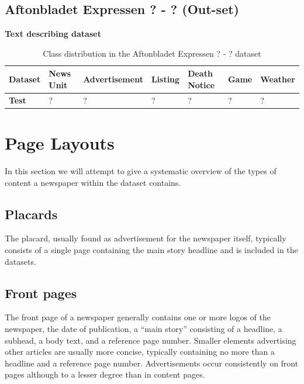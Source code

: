 \documentclass[english, bibtex]{kththesis}
\begin{document}
\subsection{Aftonbladet Expressen ? - ? (Out-set)}

\textbf{Text describing dataset}

\begin{table}[!ht]
  \begin{center}
    \caption{Class distribution in the  Aftonbladet Expressen ? - ? dataset}
    \label{tab:outsetclassdist}
    \begin{tabular}{l|l|l|l|l|l|l} %
    \textbf{Dataset} & \textbf{News Unit} & \textbf{Advertisement} & \textbf{Listing} & \textbf{Death Notice} & \textbf{Game} & \textbf{Weather}  \\ 
    \hline
    \textbf{Test} & ? & ? & ? & ? & ? & ? \\    \hline
    \end{tabular}
  \end{center}
\end{table}


\section{Page Layouts}

In this section we will attempt to give a systematic overview of the types of content a newspaper within the dataset contains. 

\subsection{Placards}

The placard, usually found as advertisement for the newspaper itself, typically consists of a single page containing the main story headline and is included in the datasets. 

\subsection{Front pages}

The front page of a newspaper generally contains one or more logos of the newspaper, the date of publication, a “main story” consisting of a headline, a subhead, a body text, and a reference page number. Smaller elements advertising other articles are usually more concise, typically containing no more than a headline and a reference page number. Advertisements occur consistently on front pages although to a lesser degree than in content pages. 
\end{document}
